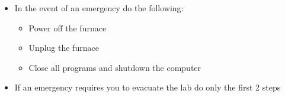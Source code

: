 \documentclass[letterpaper,11pt]{article}
\begin{document}
    \begin{itemize}
    \item In the event of an emergency do the following:
        
        \begin{itemize}
        \item Power off the furnace
        \item Unplug the furnace
        \item Close all programs and shutdown the computer
        \end{itemize}
    
    \item If an emergency requires you to evacuate the lab do only the first 
        2 steps
    \end{itemize}
\end{document}
